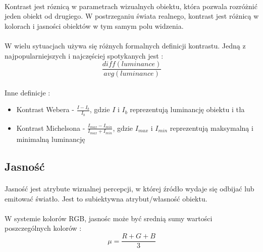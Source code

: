 \documentclass[wide,a4paper,titlepage,12pt] {article}
\begin{document}
\paragraph{} %
\label{par:}
Kontrast jest róznicą w parametrach wizualnych obiektu, która pozwala rozróżnić jeden obiekt od drugiego. W postrzeganiu świata realnego, kontrast jest różnicą w kolorach i jasności obiektów w tym samym polu widzenia.  

\paragraph{} %
\label{par:}
W wielu sytuacjach używa się różnych formalnych definicji kontrastu. Jedną z najpopularniejszych i najczęściej spotykanych jest : 
\begin{equation}
    \frac{diff(luminance)}{avg(luminance)}
\end{equation}

\paragraph{}
Inne definicje : 
\begin{itemize}
    \item Kontrast Webera - $\frac{I-I_{b}}{I_{b}}$, gdzie $I$ i $I_{b}$ reprezentują luminancję obiektu i tła
    \item Kontrast Michelsona -  $\frac{I_{max}-I_{min}}{I_{max}+I_{min}}$, gdzie $I_{max}$ i $I_{min}$ reprezentują maksymalną i minimalną luminancję 
\end{itemize}

\subsection{Jasność}
\paragraph{} %
\label{par:}
Jasność jest atrybute wizualnej percepcji, w której źródło wydaje się odbijać lub emitować światło. Jest to subiektywna atrybut$/$własność obiektu.

\paragraph{} %
\label{par:}
W systemie kolorów RGB, jasnośc może być srednią sumy wartości poszczególnych kolorów :
\begin{equation}
    \mu = \frac{R+G+B}{3}
\end{equation}
\end{document}
